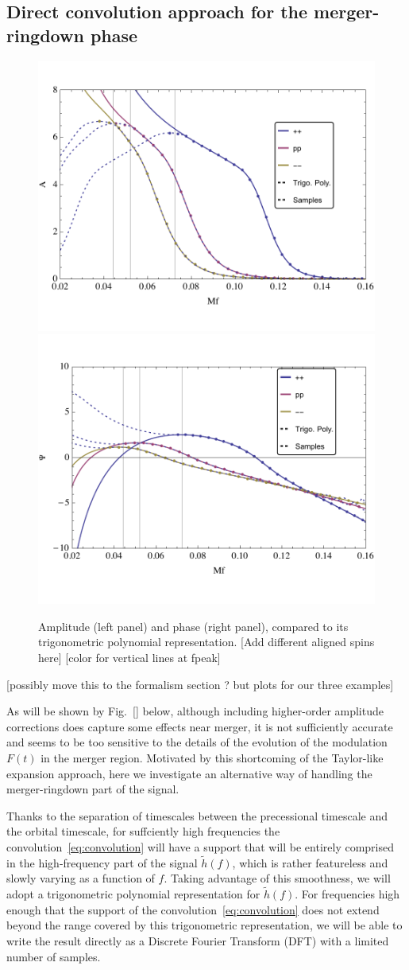 \documentclass[aps,showpacs,twocolumn,
prd,superscriptaddress,nofootinbib]{revtex4-1}
\newcommand{\SM}[1]{{\color{Red} #1}}
\begin{document}

\subsection{Direct convolution approach for the merger-ringdown phase}
\label{subsec:convolution}

\begin{figure}
  \centering
  \includegraphics[width=.48\linewidth]{plots/trig_amp.pdf}
  \hspace{0.2cm}
  \includegraphics[width=.48\linewidth]{plots/trig_phase.pdf}
  \caption{Amplitude (left panel) and phase (right panel), compared to its trigonometric polynomial representation. \SM{[Add different aligned spins here]} \SM{[color for vertical lines at fpeak]}}
  \label{fig:trig}
\end{figure}

\SM{[possibly move this to the formalism section ? but plots for our three examples]}

As will be shown by Fig.~\ref{} below, although including higher-order amplitude corrections does capture some effects near merger, it is not sufficiently accurate and seems to be too sensitive to the details of the evolution of the modulation $F(t)$ in the merger region. Motivated by this shortcoming of the Taylor-like expansion approach, here we investigate an alternative way of handling the merger-ringdown part of the signal.

Thanks to the separation of timescales between the precessional timescale and the orbital timescale, for suffciently high frequencies the convolution~\eqref{eq:convolution} will have a support that will be entirely comprised in the high-frequency part of the signal $\tilde{h}(f)$, which is rather featureless and slowly varying as a function of $f$. Taking advantage of this smoothness, we will adopt a trigonometric polynomial representation for $\tilde{h}(f)$. For frequencies high enough that the support of the convolution~\eqref{eq:convolution} does not extend beyond the range covered by this trigonometric representation, we will be able to write the result directly as a Discrete Fourier Transform (DFT) with a limited number of samples.
\end{document}
